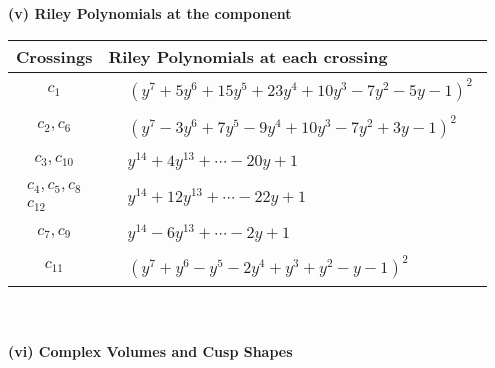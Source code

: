 \documentclass[1p]{elsarticle_modified}
\theoremstyle{definition}
\begin{document}
\newpage\renewcommand{\arraystretch}{1}
\flushleft \textbf{(v) Riley Polynomials at the component}\newline \\
\begin{tabular}{m{50pt}|m{274pt}}
Crossings & \hspace{64pt}Riley Polynomials at each crossing \\
\hline $$\begin{aligned}c_{1}\end{aligned}$$&$\begin{aligned}
&(y^7+5 y^6+15 y^5+23 y^4+10 y^3-7 y^2-5 y-1)^2
\end{aligned}$\\
\hline $$\begin{aligned}c_{2},c_{6}\end{aligned}$$&$\begin{aligned}
&(y^7-3 y^6+7 y^5-9 y^4+10 y^3-7 y^2+3 y-1)^2
\end{aligned}$\\
\hline $$\begin{aligned}c_{3},c_{10}\end{aligned}$$&$\begin{aligned}
&y^{14}+4 y^{13}+\cdots-20 y+1
\end{aligned}$\\
\hline $$\begin{aligned}c_{4},c_{5},c_{8}\\c_{12}\end{aligned}$$&$\begin{aligned}
&y^{14}+12 y^{13}+\cdots-22 y+1
\end{aligned}$\\
\hline $$\begin{aligned}c_{7},c_{9}\end{aligned}$$&$\begin{aligned}
&y^{14}-6 y^{13}+\cdots-2 y+1
\end{aligned}$\\
\hline $$\begin{aligned}c_{11}\end{aligned}$$&$\begin{aligned}
&(y^7+y^6- y^5-2 y^4+y^3+y^2- y-1)^2
\end{aligned}$\\
\hline
\end{tabular}\\~\\
\newpage\flushleft \textbf{(vi) Complex Volumes and Cusp Shapes}
\end{document}
